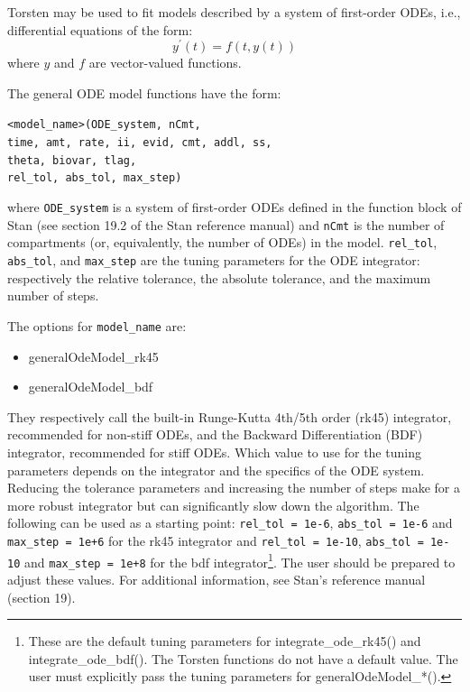 \documentclass[11pt]{amsart}
\begin{document}
Torsten may be used to fit models described by a system of first-order ODEs, i.e., differential equations of the form:
$$ y^\prime\left(t\right) = f\left(t, y\left(t\right)\right) $$
where $y$ and $f$ are vector-valued functions.

The general ODE model functions have the form:

\texttt{<model\_name>(ODE\_system, nCmt, \\
\phantom{<model\_name>} time, amt, rate, ii, evid, cmt, addl, ss, \\
\phantom{<model\_name>} theta, biovar, tlag, \\                              
\phantom{<model\_name>} rel\_tol, abs\_tol, max\_step)}
                              
where \texttt{ODE\_system} is a system of first-order ODEs defined in the function block of Stan (see section 19.2 of the Stan reference manual) and \texttt{nCmt} is the number of compartments (or, equivalently, the number of ODEs) in the model. \texttt{rel\_tol}, \texttt{abs\_tol}, and \texttt{max\_step} are the tuning parameters for the ODE integrator: respectively the relative tolerance, the absolute tolerance, and the maximum number of steps.

The options for \texttt{model\_name} are:
\begin{itemize}
  \item generalOdeModel\_rk45
  \item generalOdeModel\_bdf
\end{itemize}

They respectively call the built-in Runge-Kutta 4th/5th order (rk45) integrator, recommended for non-stiff ODEs, and the Backward Differentiation (BDF) integrator, recommended for stiff ODEs. Which value to use for the tuning parameters depends on the integrator and the specifics of the ODE system. Reducing the tolerance parameters and increasing the number of steps make for a more robust integrator but can significantly slow down the algorithm. The following can be used as a starting point:  \mbox{\texttt{rel\_tol = 1e-6}}, \mbox{\texttt{abs\_tol = 1e-6}} and \mbox{\texttt{max\_step = 1e+6}} for the rk45 integrator and \mbox{\texttt{rel\_tol = 1e-10}}, \mbox{\texttt{abs\_tol = 1e-10}} and \mbox{\texttt{max\_step = 1e+8}} for the bdf integrator\footnote{These are the default tuning parameters for integrate\_ode\_rk45() and integrate\_ode\_bdf(). The Torsten functions do not have a default value. The user must explicitly pass the tuning parameters for generalOdeModel\_*().}. The user should be prepared to adjust these values. For additional information, see Stan's reference manual (section 19).
\end{document}
